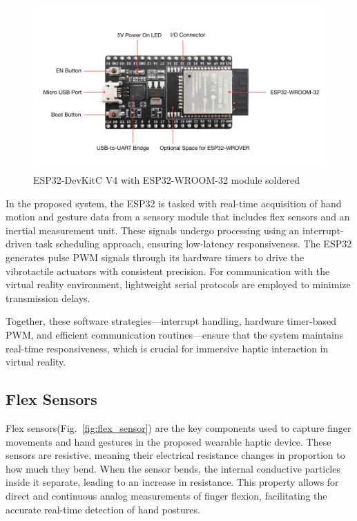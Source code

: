 \begin{figure}[H]\centering
	\includegraphics[width=1\textwidth]{Pictures/esp32.jpg}%
	\caption{ESP32-DevKitC V4 with ESP32-WROOM-32 module soldered\cite{esp32docs}}\label{fig:esp32}%
\end{figure}

In the proposed system, the ESP32 is tasked with real-time acquisition of hand motion and gesture data from a sensory module that includes flex sensors and an inertial measurement unit. These signals undergo processing using an interrupt-driven task scheduling approach, ensuring low-latency responsiveness. The ESP32 generates pulse PWM signals through its hardware timers to drive the vibrotactile actuators with consistent precision. For communication with the virtual reality environment, lightweight serial protocols are employed to minimize transmission delays. 

Together, these software strategies—interrupt handling, hardware timer-based PWM, and efficient communication routines—ensure that the system maintains real-time responsiveness, which is crucial for immersive haptic interaction in virtual reality.


\newpage
\subsection{Flex Sensors}
Flex sensors(Fig.~\ref{fig:flex_sensor}) are the key components used to capture finger movements and hand gestures in the proposed wearable haptic device. These sensors are resistive, meaning their electrical resistance changes in proportion to how much they bend. When the sensor bends, the internal conductive particles inside it separate, leading to an increase in resistance. This property allows for direct and continuous analog measurements of finger flexion, facilitating the accurate real-time detection of hand postures.

